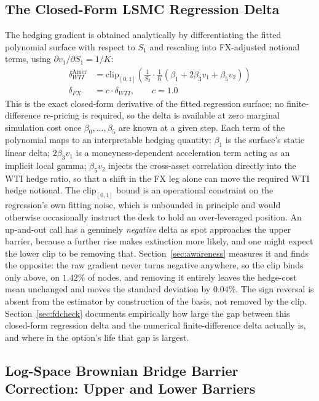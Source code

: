 \documentclass[11pt,a4paper]{article}
\begin{document}
\subsection{The Closed-Form LSMC Regression Delta}
\label{sec:delta}

The hedging gradient is obtained analytically by differentiating the fitted polynomial surface with respect to $S_1$ and rescaling into FX-adjusted notional terms, using $\partial v_1/\partial S_1 = 1/K$:
\begin{align}
\delta_{WTI}^{\text{Amer}} &= \mathrm{clip}_{[0,1]}\!\left(\frac{1}{S_2}\cdot\frac{1}{K}\left(\beta_1+2\beta_3 v_1+\beta_5 v_2\right)\right) \\
\delta_{FX} &= c\cdot\delta_{WTI}, \qquad c=1.0
\end{align}
This is the exact closed-form derivative of the fitted regression surface; no finite-difference re-pricing is required, so the delta is available at zero marginal simulation cost once $\beta_0,\ldots,\beta_5$ are known at a given step. Each term of the polynomial maps to an interpretable hedging quantity: $\beta_1$ is the surface's static linear delta; $2\beta_3 v_1$ is a moneyness-dependent acceleration term acting as an implicit local gamma; $\beta_5 v_2$ injects the cross-asset correlation directly into the WTI hedge ratio, so that a shift in the FX leg alone can move the required WTI hedge notional. The $\mathrm{clip}_{[0,1]}$ bound is an operational constraint on the regression's own fitting noise, which is unbounded in principle and would otherwise occasionally instruct the desk to hold an over-leveraged position. An up-and-out call has a genuinely \emph{negative} delta as spot approaches the upper barrier, because a further rise makes extinction more likely, and one might expect the lower clip to be removing that. Section~\ref{sec:awareness} measures it and finds the opposite: the raw gradient never turns negative anywhere, so the clip binds only above, on $1.42\%$ of nodes, and removing it entirely leaves the hedge-cost mean unchanged and moves the standard deviation by $0.04\%$. The sign reversal is absent from the estimator by construction of the basis, not removed by the clip. Section~\ref{sec:fdcheck} documents empirically how large the gap between this closed-form regression delta and the numerical finite-difference delta actually is, and where in the option's life that gap is largest.

\subsection{Log-Space Brownian Bridge Barrier Correction: Upper and Lower Barriers}
\label{sec:bridge}
\end{document}
